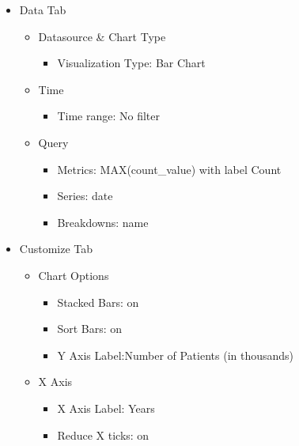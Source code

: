 \documentclass[
]{book}
\providecommand{\tightlist}{%
  \setlength{\itemsep}{0pt}\setlength{\parskip}{0pt}}
\begin{document}
\begin{itemize}
\tightlist
\item
  Data Tab

  \begin{itemize}
  \tightlist
  \item
    Datasource \& Chart Type

    \begin{itemize}
    \tightlist
    \item
      Visualization Type: Bar Chart
    \end{itemize}
  \item
    Time

    \begin{itemize}
    \tightlist
    \item
      Time range: No filter
    \end{itemize}
  \item
    Query

    \begin{itemize}
    \tightlist
    \item
      Metrics: MAX(count\_value) with label Count
    \item
      Series: date
    \item
      Breakdowns: name
    \end{itemize}
  \end{itemize}
\item
  Customize Tab

  \begin{itemize}
  \tightlist
  \item
    Chart Options

    \begin{itemize}
    \tightlist
    \item
      Stacked Bars: on
    \item
      Sort Bars: on
    \item
      Y Axis Label:Number of Patients (in thousands)
    \end{itemize}
  \item
    X Axis

    \begin{itemize}
    \tightlist
    \item
      X Axis Label: Years
    \item
      Reduce X ticks: on
    \end{itemize}
  \end{itemize}
\end{itemize}
\end{document}
